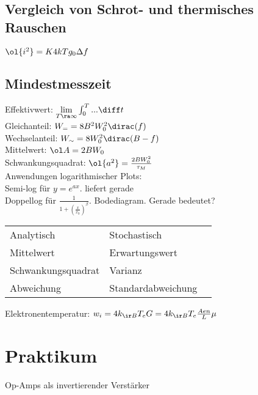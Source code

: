 \documentclass[fs, footer]{latex4ei}
\begin{document}
\begin{multicols}{4}
	\subsection{Vergleich von Schrot- und thermisches Rauschen}
	$\ol{i^2} = K 4 k T g_0 \Delta f$



	\subsection{Mindestmesszeit}
	Effektivwert: $\lim\limits_{T \ra \infty} \int_0^T ... \diff t$\\
	Gleichanteil: $W_{=} = 8B^2W_0^2 \dirac(f)$\\
	Wechselanteil: $W_\sim = 8 W_0^2 \dirac(B-f)$\\
	Mittelwert: $\ol A = 2B W_0$\\
	Schwankungsquadrat: $\ol{a^2} = \frac{2 B W_0^2}{\tau_M}$\\
	


	







Anwendungen logarithmischer Plots:\\
Semi-log für $y = e^{ax}$. liefert gerade\\
Doppellog für $\frac{1}{1+\left(\frac{x}{x_0}\right)^\beta}$. Bodediagram.
Gerade bedeutet?



	\begin{tabular}{lll}
	Analytisch & Stochastisch\\
	Mittelwert & Erwartungswert\\
	Schwankungsquadrat & Varianz\\
	Abweichung & Standardabweichung\\
	\end{tabular}






	Elektronentemperatur:
	$w_i = 4 k_{\ir B} T_e G = 4 k_{\ir B} T_e \frac{A e n}{L} \mu$









\section{Praktikum}
Op-Amps als invertierender Verstärker




\end{multicols}

\end{document}
